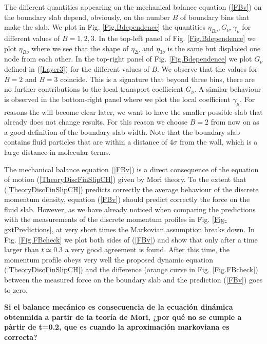 \documentclass[b5paper,openright,10pt]{book}
\newcommand{\Note}[1]{{\bf \color{red}#1}}    %
\begin{document}
The different quantities appearing  on the mechanical balance equation
(\ref{FBv}) on the boundary slab  depend, obviously, on the number $B$
of   boundary  bins   that   make   the  slab.    We   plot  in   Fig.
\ref{Fig.Bdependence}  the  quantities  $\eta_{B\nu},G_\nu,\gamma_\nu$
for   different  values   of   $B=1,2,3$.   In   the   top-left  panel   of
Fig. \ref{Fig.Bdependence} we plot $\eta_{B\nu}$ where we see that the
shape of $\eta_{2\nu}$ and $\eta_{3\nu}$ is the same but displaced one
node    from    each    other.      In    the    top-right    panel    of
Fig. \ref{Fig.Bdependence}  we plot $G_\nu$ defined  in (\ref{Layer3})
for the different values of $B$.  We observe that the values for $B=2$
and $B=3$ coincide. This is a  signature that beyond three bins, there
are  no  further  contributions  to the  local  transport  coefficient
$G_\nu$. A similar behaviour is observed  in the bottom-right panel where we
plot the local  coefficient $\gamma_\mu$. For reasons  the will become
clear later,  we want to have  the smaller possible slab  that already
does not change  results. For this reason we choose  $B=2$ from now on
as  a good  definition  of  the boundary  slab  width.  Note that  the
boundary slab contains  fluid particles that are within  a distance of
$4\sigma$ from the wall, which is a large distance in molecular terms.

The  mechanical balance  equation (\ref{FBv})  is a  direct
consequence of  the equation of motion  (\ref{TheoryDiscFinSlipCH}) given by
Mori  theory.   To  the  extent  that  (\ref{TheoryDiscFinSlipCH})  predicts
correctly the average behaviour of  the discrete momentum density, equation
(\ref{FBv})  should predict  correctly the  force on  the fluid  slab.
However, as  we have  already noticed  when comparing  the predictions
with   the  measurements   of  the   discrete  momentum   profiles  in
Fig. \ref{Fig-gxtPredictions}, at very short  times the Markovian assumption breaks
down.  In Fig. \ref{Fig.FBcheck} we plot both sides of (\ref{FBv}) and
show that only  after a time larger than $t\simeq  0.3$ a very good
agreement is found.  After this  time, the momentum profile obeys very
well  the  proposed  dynamic equation  (\ref{TheoryDiscFinSlipCH})  and  the
difference (orange curve in  Fig. \ref{Fig.FBcheck}) between the measured
force  on the  boundary slab  and the  prediction (\ref{FBv})  goes to
zero.

\Note{Si el balance mecánico es consecuencia de la ecuación dinámica obtenmida a partir de la teoría de Mori, ¿por qué no se cumple a pàrtir de t=0.2, que es cuando la aproximación markoviana es correcta?}
\end{document}
